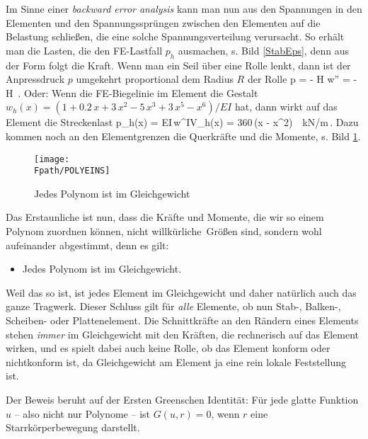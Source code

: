 Im Sinne einer {\em backward error analysis\/} kann man
nun aus den Spannungen in den Elementen und den Spannungsspr\"{u}ngen zwischen den Elementen
auf die Belastung schlie{\ss}en, die eine solche Spannungsverteilung verursacht. So erh\"{a}lt
man die Lasten, die den FE-Lastfall $p_h$ ausmachen, s. Bild \ref{StabEps}, denn aus der
Form folgt die Kraft. Wenn man ein Seil \"{u}ber eine Rolle lenkt, dann ist der Anpressdruck
$p$ umgekehrt proportional dem Radius $R$ der Rolle
\bfoo
p = - H w'' = - H \,.
\efoo
Oder: Wenn die FE-Biegelinie im Element die Gestalt $w_h(x) = (1 + 0.2\,x + 3\,x^2 -
5\,x^3 + 3\,x^5 - x^6)/ EI $ hat, dann wirkt auf das Element die Streckenlast
\bfoo
p_h(x) = EI\,w^{IV}_h(x) = 360\,(x - x^2)\,\,\, \,\mbox{kN/m}\,.
\efoo
Dazu kommen noch an den Elementgrenzen die Querkr\"{a}fte und die Momente, s. Bild
\ref{PolyEins}.
\begin{figure}[tbp]
\if {} \sidecaption \fi
\texttt{[image: \\Fpath/POLYEINS]}
\caption{Jedes Polynom ist im Gleichgewicht} \label{PolyEins}
\end{figure}%

Das Erstaunliche ist nun, dass die Kr\"{a}fte und Momente, die wir so einem Polynom zuordnen
k\"{o}nnen, nicht \hlq willk\"{u}rliche\grq\, Gr\"{o}{\ss}en sind, sondern wohl aufeinander abgestimmt,
denn es gilt:
\begin{itemize}
\item Jedes Polynom ist im Gleichgewicht.
\end{itemize}
Weil das so ist, ist jedes Element im Gleichgewicht und daher nat\"{u}rlich auch das ganze
Tragwerk. Dieser Schluss gilt f\"{u}r {\em alle\/} Elemente, ob nun Stab-, Balken-,
Scheiben- oder Plattenelement. Die Schnittkr\"{a}fte an den R\"{a}ndern eines Elements stehen
{\em immer\/} im Gleichgewicht mit den Kr\"{a}ften, die rechnerisch auf das Element wirken,
und es spielt dabei auch keine Rolle, ob das Element konform oder nichtkonform ist, da
Gleichgewicht am Element ja eine rein lokale Feststellung ist.

Der Beweis beruht auf der Ersten Greenschen Identit\"{a}t: F\"{u}r jede glatte Funktion $u$ --
also nicht nur Polynome -- ist $G(u,r) = 0$, wenn $r$ eine Starrk\"{o}rperbewegung darstellt.

